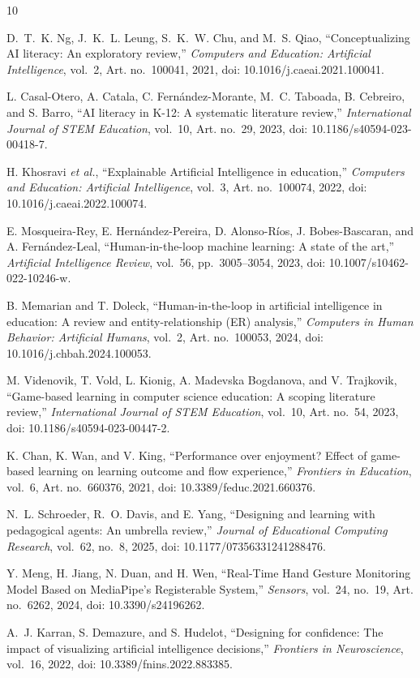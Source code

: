 \documentclass[12pt,oneside]{report}
\begin{document}

\begin{thebibliography}{10}

D.~T.~K. Ng, J.~K.~L. Leung, S.~K.~W. Chu, and M.~S. Qiao, ``Conceptualizing AI literacy: An exploratory review,'' \textit{Computers and Education: Artificial Intelligence}, vol.~2, Art. no.~100041, 2021, doi: 10.1016/j.caeai.2021.100041.

L. Casal-Otero, A. Catala, C. Fern\'andez-Morante, M.~C. Taboada, B. Cebreiro, and S. Barro, ``AI literacy in K-12: A systematic literature review,'' \textit{International Journal of STEM Education}, vol.~10, Art. no.~29, 2023, doi: 10.1186/s40594-023-00418-7.

H. Khosravi \textit{et al.}, ``Explainable Artificial Intelligence in education,'' \textit{Computers and Education: Artificial Intelligence}, vol.~3, Art. no.~100074, 2022, doi: 10.1016/j.caeai.2022.100074.

E. Mosqueira-Rey, E. Hern\'andez-Pereira, D. Alonso-R\'ios, J. Bobes-Bascaran, and A. Fern\'andez-Leal, ``Human-in-the-loop machine learning: A state of the art,'' \textit{Artificial Intelligence Review}, vol.~56, pp.~3005--3054, 2023, doi: 10.1007/s10462-022-10246-w.

B. Memarian and T. Doleck, ``Human-in-the-loop in artificial intelligence in education: A review and entity-relationship (ER) analysis,'' \textit{Computers in Human Behavior: Artificial Humans}, vol.~2, Art. no.~100053, 2024, doi: 10.1016/j.chbah.2024.100053.

M. Videnovik, T. Vold, L. Kionig, A. Madevska Bogdanova, and V. Trajkovik, ``Game-based learning in computer science education: A scoping literature review,'' \textit{International Journal of STEM Education}, vol.~10, Art. no.~54, 2023, doi: 10.1186/s40594-023-00447-2.

K. Chan, K. Wan, and V. King, ``Performance over enjoyment? Effect of game-based learning on learning outcome and flow experience,'' \textit{Frontiers in Education}, vol.~6, Art. no.~660376, 2021, doi: 10.3389/feduc.2021.660376.

N.~L. Schroeder, R.~O. Davis, and E. Yang, ``Designing and learning with pedagogical agents: An umbrella review,'' \textit{Journal of Educational Computing Research}, vol.~62, no.~8, 2025, doi: 10.1177/07356331241288476.

Y. Meng, H. Jiang, N. Duan, and H. Wen, ``Real-Time Hand Gesture Monitoring Model Based on MediaPipe's Registerable System,'' \textit{Sensors}, vol.~24, no.~19, Art. no.~6262, 2024, doi: 10.3390/s24196262.

A.~J. Karran, S. Demazure, and S. Hudelot, ``Designing for confidence: The impact of visualizing artificial intelligence decisions,'' \textit{Frontiers in Neuroscience}, vol.~16, 2022, doi: 10.3389/fnins.2022.883385.

\end{thebibliography}
\end{document}
